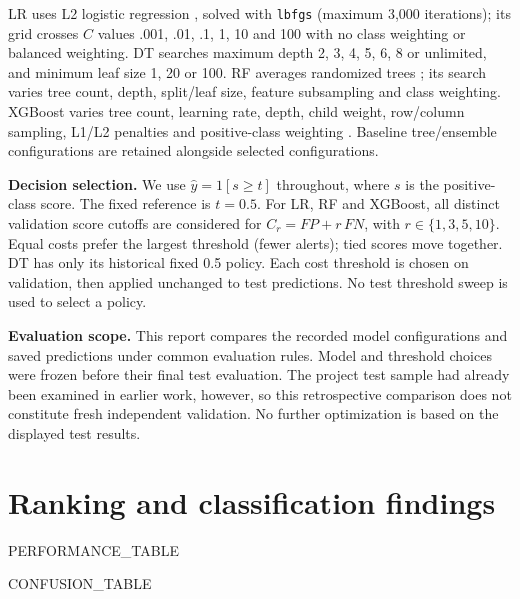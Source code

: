 \documentclass{article}
\begin{document}
LR uses L2 logistic regression \citep{esl}, solved with \texttt{lbfgs} (maximum 3,000 iterations); its grid crosses $C$ values .001, .01, .1, 1, 10 and 100 with no class weighting or balanced weighting. DT searches maximum depth 2, 3, 4, 5, 6, 8 or unlimited, and minimum leaf size 1, 20 or 100. RF averages randomized trees \citep{rf}; its search varies tree count, depth, split/leaf size, feature subsampling and class weighting. XGBoost varies tree count, learning rate, depth, child weight, row/column sampling, L1/L2 penalties and positive-class weighting \citep{xgboost}. Baseline tree/ensemble configurations are retained alongside selected configurations.

\textbf{Decision selection.} We use $\hat y=1[s\geq t]$ throughout, where $s$ is the positive-class score. The fixed reference is $t=0.5$. For LR, RF and XGBoost, all distinct validation score cutoffs are considered for $C_r=FP+r\,FN$, with $r\in\{1,3,5,10\}$. Equal costs prefer the largest threshold (fewer alerts); tied scores move together. DT has only its historical fixed 0.5 policy. Each cost threshold is chosen on validation, then applied unchanged to test predictions. No test threshold sweep is used to select a policy.

\textbf{Evaluation scope.} This report compares the recorded model configurations and saved predictions under common evaluation rules. Model and threshold choices were frozen before their final test evaluation. The project test sample had already been examined in earlier work, however, so this retrospective comparison does not constitute fresh independent validation. No further optimization is based on the displayed test results.
\newpage
\section{Ranking and classification findings}
\begin{center}
\begin{minipage}{\linewidth}
\centering
{{PERFORMANCE_TABLE}}
\end{minipage}
\end{center}

\begin{center}
\begin{minipage}{\linewidth}
\centering
{{CONFUSION_TABLE}}
\end{minipage}
\end{center}
\end{document}
